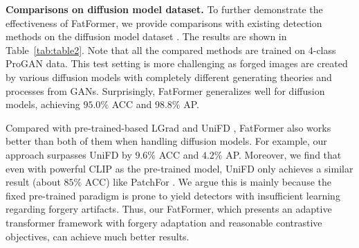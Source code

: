 \documentclass[10pt,twocolumn,letterpaper]{article}
\begin{document}
\begin{table}[t]
\begin{subtable}[t]{0.42\textwidth}
     \end{subtable}
     \hfill
    \begin{subtable}[t]{0.53\textwidth}
        \centering
        \renewcommand\arraystretch{1.0}
        \vspace{2mm}
        \caption{\textbf{Model components.} Both components are essential in our FatFormer. We also conduct an extra experiment to test the zero-shot performance by removing the forgery-aware adapter and language-guided alignment.}
        \label{tab:ablationmodelcomponnent}
     \end{subtable}
\vspace{-3mm}
\end{table}

\noindent \textbf{Comparisons on diffusion model dataset.}
To further demonstrate the effectiveness of FatFormer, we provide comparisons with existing detection methods on the diffusion model dataset \cite{ojha2023towards}. The results are shown in Table~\ref{tab:table2}. Note that all the compared methods are trained on 4-class ProGAN data. This test setting is more challenging as forged images are created by various diffusion models with completely different generating theories and processes from GANs.
Surprisingly, FatFormer generalizes well for diffusion models, achieving $95.0\%$ ACC and $98.8\%$ AP. 

Compared with pre-trained-based LGrad \cite{tan2023learning} and UniFD \cite{ojha2023towards}, FatFormer also works better than both of them when handling diffusion models. For example, our approach surpasses UniFD by $9.6\%$ ACC and $4.2\%$ AP. Moreover, we find that even with powerful CLIP as the pre-trained model, UniFD only achieves a similar result (about $85\%$ ACC) like PatchFor \cite{chai2020makes}. We argue this is mainly because the fixed pre-trained paradigm is prone to yield detectors with insufficient learning regarding forgery artifacts. Thus, our FatFormer, which presents an adaptive transformer framework with forgery adaptation and reasonable contrastive objectives, can achieve much better results.
\end{document}
